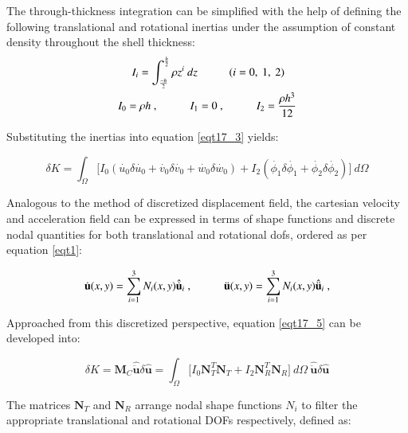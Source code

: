 The through-thickness integration can be simplified with the help of defining the following translational and rotational inertias under the assumption of constant density throughout the shell thickness:
\begin{gather} 
	\begin{aligned}
		&\ \ \ \ \ 
		I_i = \int_{\frac{-h}{2}}^{\frac{h}{2}} \rho 
		z^i
		\ dz
		\hspace{10mm}
		(i = 0,\ 1,\ 2)
		\\
		&I_0 = \rho h\ ,
		\hspace{10mm}
		I_1 = 0\ ,
		\hspace{10mm}
		I_2 = \frac{\rho h^3}{12}
		\label{eqt17_4}
	\end{aligned}
\end{gather}

Substituting the inertias into equation \ref{eqt17_3} yields:

\begin{equation} 
	\delta K = \int_{\Omega} 
	\Big[I_0
	(\dot{u_0} \delta \dot{u_0} 
	+ \dot{v_0} \delta \dot{v_0}
	+ \dot{w_0} \delta \dot{w_0}
	)  
	+
	I_2
	(\dot{\phi_1} \delta \dot{\phi_1} 
	+ \dot{\phi_2} \delta \dot{\phi_2} 
	)  
	\Big]
	\ d\Omega
	\label{eqt17_5}
\end{equation}

Analogous to the method of discretized displacement field, the cartesian velocity and acceleration field can be expressed in terms of shape functions and discrete nodal quantities for both translational and rotational dofs, ordered as per equation \ref{eqt1}:

\begin{equation} 
\dot{\mathbf{u}} (x,y)
=
\sum_{i=1}^{3} N_i (x,y)
\hat{\dot{\mathbf{u}}}_i\ ,
\hspace{10mm}
\ddot{\mathbf{u}} (x,y)
=
\sum_{i=1}^{3} N_i (x,y)
\hat{\ddot{\mathbf{u}}}_i\ ,
\label{eqt17_6}
\end{equation}

Approached from this discretized perspective, equation \ref{eqt17_5} can be developed into:

\begin{equation} 
\delta K = \mathbf{M}_C \hat{\ddot{\mathbf{{u}}}} \delta \hat{\mathbf{u}}
=
\int_{\Omega} 
\Big[I_0
\mathbf{N}_T^T
\mathbf{N}_T
+
I_2
\mathbf{N}_R^T
\mathbf{N}_R
\Big]
\ d\Omega\ 
\hat{\ddot{\mathbf{{u}}}}
\delta \hat{\mathbf{u}}
\label{eqt17_7}
\end{equation}

The matrices $\mathbf{N}_T$ and $\mathbf{N}_R$ arrange nodal shape functions $N_i$ to filter the appropriate translational and rotational DOFs respectively, defined as:

